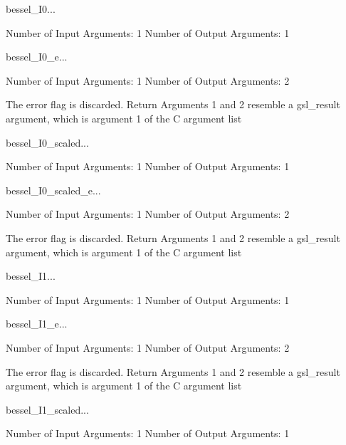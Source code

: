\begin{funcdesc}{bessel_I0}{...}

    Number of Input  Arguments:  1
    Number of Output Arguments:  1
\end{funcdesc}

\begin{funcdesc}{bessel_I0_e}{...}

    Number of Input  Arguments:  1
    Number of Output Arguments:  2

The error flag is discarded.
Return Arguments 1 and 2 resemble a gsl_result argument,
	which is  argument 1 of the C argument list

\end{funcdesc}

\begin{funcdesc}{bessel_I0_scaled}{...}

    Number of Input  Arguments:  1
    Number of Output Arguments:  1
\end{funcdesc}

\begin{funcdesc}{bessel_I0_scaled_e}{...}

    Number of Input  Arguments:  1
    Number of Output Arguments:  2

The error flag is discarded.
Return Arguments 1 and 2 resemble a gsl_result argument,
	which is  argument 1 of the C argument list

\end{funcdesc}

\begin{funcdesc}{bessel_I1}{...}

    Number of Input  Arguments:  1
    Number of Output Arguments:  1
\end{funcdesc}

\begin{funcdesc}{bessel_I1_e}{...}

    Number of Input  Arguments:  1
    Number of Output Arguments:  2

The error flag is discarded.
Return Arguments 1 and 2 resemble a gsl_result argument,
	which is  argument 1 of the C argument list

\end{funcdesc}

\begin{funcdesc}{bessel_I1_scaled}{...}

    Number of Input  Arguments:  1
    Number of Output Arguments:  1
\end{funcdesc}

